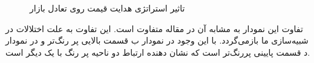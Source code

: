 \documentclass[13pt,onecolumn,a4paper]{article}
\begin{document}
\begin{figure}[H]
	\centering
	\hfil
	
	\medskip
	\hfil
	
	\caption{تاثیر استراتژی هدایت قیمت روی تعادل بازار}
	\label{fig:myfigure}
\end{figure}
	تفاوت این نمودار به مشابه آن در مقاله متفاوت است. این تفاوت به علت اختلالات در شبیه‌سازی ما بازمی‌گردد. با این وجود در نمودار ب قسمت بالایی پر رنگ‌تر و در نمودار د قسمت پایینی پررنگ‌تر است که نشان دهنده ارتباط دو ناحیه پر رنگ با یک دیگر است.
	
\end{document}
